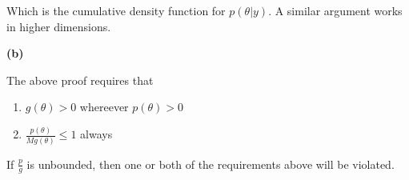 \documentclass[letterpaper,11pt]{article}
\begin{document}
Which is the cumulative density function for $p(\theta\vert y)$.
A similar argument works in higher dimensions.

\begin{addmargin}[-1.1em]{0em} \textbf{(b)}\par \end{addmargin}
The above proof requires that
\begin{enumerate}
  \item $g(\theta) > 0$ whereever $p(\theta) > 0$
  \item $\frac{p(\theta)}{Mg(\theta)}\leq 1$ always
\end{enumerate}
If $\frac{p}{g}$ is unbounded, then one or both of the requirements above will be violated.
\end{document}
